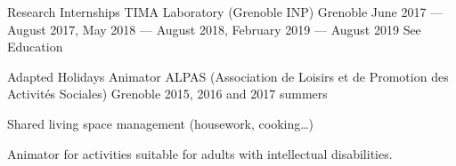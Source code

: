 \begin{cventries}
\vspace{.5cm}

\cventry
{Research Internships}
{TIMA Laboratory (Grenoble INP)}
{Grenoble}
{June 2017 --- August 2017, May 2018 --- August 2018, February 2019 --- August 2019}
{See Education}

\cventry
{Adapted Holidays Animator} %
{ALPAS (Association de Loisirs et de Promotion des Activités Sociales)} %
{Grenoble} %
{2015, 2016 and 2017 summers} %
{ %
\begin{cvitems}
\item Shared living space management (housework, cooking\ldots)
\item Animator for activities suitable for adults with intellectual disabilities.
\end{cvitems}
}


\end{cventries}